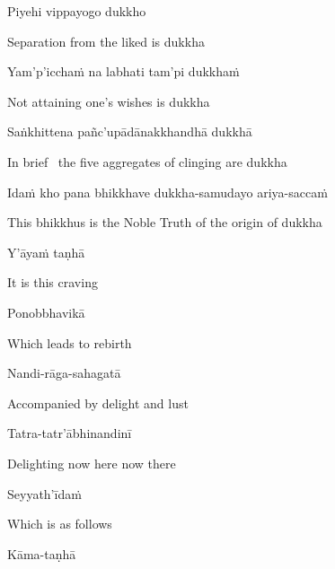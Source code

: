 Piyehi vippayogo dukkho

\begin{english}
  Separation from the liked is dukkha
\end{english}

Yam'p'icchaṁ na labhati tam'pi dukkhaṁ

\begin{english}
  Not attaining one's wishes is dukkha
\end{english}

Saṅkhittena pañc'upādānakkhandhā dukkhā

\begin{english}
  In brief \breathmark\ the five aggregates of clinging are dukkha\makeatletter\hyperlink{endnote54-appendix}\makeatother
\end{english}

Idaṁ kho pana bhikkhave dukkha-samudayo ariya-saccaṁ

\begin{english}
  This bhikkhus is the Noble Truth of the origin of dukkha
\end{english}

Y'āyaṁ taṇhā

\begin{english}
  It is this craving
\end{english}

Ponobbhavikā

\begin{english}
  Which leads to rebirth
\end{english}

Nandi-rāga-sahagatā

\begin{english}
  Accompanied by delight and lust
\end{english}

Tatra-tatr'ābhinandinī

\begin{english}
  Delighting now here now there
\end{english}

Seyyath'īdaṁ

\begin{english}
  Which is as follows
\end{english}

Kāma-taṇhā

